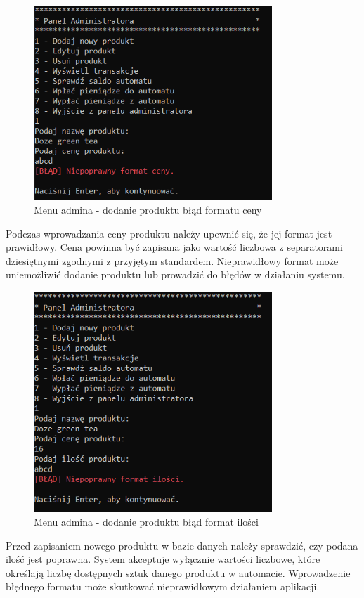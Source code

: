 \newpage


\begin{figure}[H] 
    \centering
    \includegraphics[width=0.8\textwidth]{grafiki/blad_format_ceny.png}
    \caption{\footnotesize Menu admina - dodanie produktu błąd formatu ceny}	
    \label{fig:5.10}
\end{figure}
Podczas wprowadzania ceny produktu należy upewnić się, że jej format jest prawidłowy. Cena powinna być zapisana jako wartość liczbowa z separatorami dziesiętnymi zgodnymi z przyjętym standardem. Nieprawidłowy format może uniemożliwić dodanie produktu lub prowadzić do błędów w działaniu systemu.

\newpage


\begin{figure}[H] 
    \centering
    \includegraphics[width=0.8\textwidth]{grafiki/blad_format_ilosci.png}
    \caption{\footnotesize Menu admina - dodanie produktu błąd format ilości}	
    \label{fig:5.11}
\end{figure}
Przed zapisaniem nowego produktu w bazie danych należy sprawdzić, czy podana ilość jest poprawna. System akceptuje wyłącznie wartości liczbowe, które określają liczbę dostępnych sztuk danego produktu w automacie. Wprowadzenie błędnego formatu może skutkować nieprawidłowym działaniem aplikacji.

